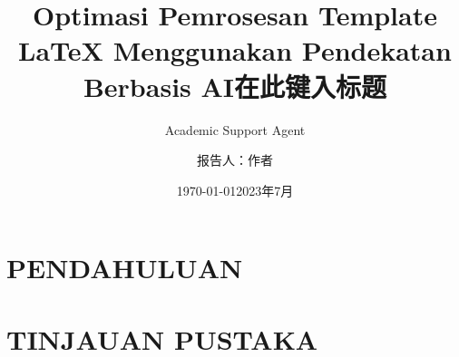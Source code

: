 \documentclass{beamer}
\title{Optimasi Pemrosesan Template LaTeX Menggunakan Pendekatan Berbasis AI}
\author{Academic Support Agent}
\date{\today}
\begin{document}
\maketitle

\begin{abstract}

\end{abstract}

\chapter{PENDAHULUAN}


\chapter{TINJAUAN PUSTAKA}


\usepackage{amsfonts,amsmath,oldgerm}
\usepackage{xeCJK}

\newcommand{\testcolor}[1]{\colorbox{#1}{\textcolor{#1}{test}}~\texttt{#1}}



\newcommand{\hrefcol}[2]{\textcolor{cyan}{\href{#1}{#2}}}

\title{在此键入标题}
\author{报告人：作者}
\date{2023年7月}
\end{document}
